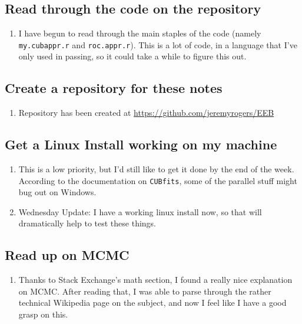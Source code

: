 \documentclass[12 pt]{article}
\begin{document}
		\subsection{Read through the code on the repository}
			\begin{enumerate}
				\item I have begun to read through the main staples of the code (namely \texttt{my.cubappr.r} and \texttt{roc.appr.r}). This is a lot of code, in a language that I've only used in passing, so it could take a while to figure this out. 
			\end{enumerate}

		
		\subsection{Create a repository for these notes}
			\begin{enumerate}
				\item Repository has been created at \url{https://github.com/jeremyrogers/EEB}
			\end{enumerate}
			
		\subsection{Get a Linux Install working on my machine}
			\begin{enumerate}
				\item This is a low priority, but I'd still like to get it done by the end of the week. According to the documentation on \texttt{CUBfits}, some of the parallel stuff might bug out on Windows.
				\item Wednesday Update: I have a working linux install now, so that will dramatically help to test these things.
			\end{enumerate}
			
		\subsection{Read up on MCMC}
			\begin{enumerate}
				\item Thanks to Stack Exchange's math section, I found a really nice explanation on MCMC. After reading that, I was able to parse through the rather technical Wikipedia page on the subject, and now I feel like I have a good grasp on this.
			\end{enumerate}
		
\end{document}

